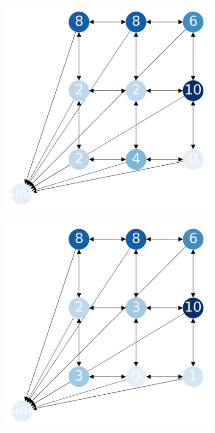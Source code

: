 \documentclass{beamer}
\begin{document}
\begin{frame}
  \begin{figure}[h!]
    \centering
      \includegraphics[scale=0.25]{sandpile_10}
  \end{figure}
\end{frame}


\begin{frame}
  \begin{figure}[h!]
    \centering
      \includegraphics[scale=0.25]{sandpile_11}
  \end{figure}
\end{frame}
\end{document}
